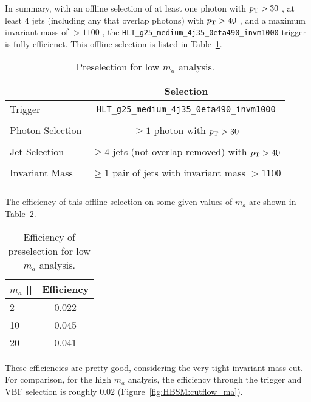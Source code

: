 In summary, with an offline selection of at least one photon with $p_{\text{T}}{}>30$ \GeV{}, at least 4 jets (including any that overlap photons) with $p_{\text{T}}{}>40$ \GeV{}, and a maximum invariant mass of $>1100$ \GeV{}, the \texttt{HLT\_g25\_medium\_4j35\_0eta490\_invm1000} trigger is fully efficienct.
This offline selection is listed in Table~\ref{tab:HBSM_app:new_preselection}.
\begin{table}[htbp]
  \begin{center}
  \caption{Preselection for low $m_a$ analysis.}
  \label{tab:HBSM_app:new_preselection}
    {\footnotesize
  \begin{tabular}{ l c }
    \toprule
    & Selection \\
    \midrule
    Trigger & \texttt{HLT\_g25\_medium\_4j35\_0eta490\_invm1000} \\
    \\
    Photon Selection  & $\geq1$ photon with $p_{\text{T}}{}>30$ \GeV{} \\
    \\ 
    Jet Selection  & $\geq4$ jets (not overlap-removed) with $p_{\text{T}}{}>40$ \GeV{} \\
    \\ 
    Invariant Mass  & $\geq1$ pair of jets with invariant mass $>1100$ \GeV{} \\
    \\ 
    \bottomrule
  \end{tabular}
    }
  \end{center}
\end{table}

The efficiency of this offline selection on some given values of $m_a$ are shown in Table~\ref{tab:HBSM_app:new_preselection_eff}.
\begin{table}[htbp]
  \begin{center}
  \caption{Efficiency of preselection for low $m_a$ analysis.}
  \label{tab:HBSM_app:new_preselection_eff}
    {\footnotesize
  \begin{tabular}{ l c }
    \toprule
    $m_a$ [\GeV{}] & Efficiency \\
    \midrule
    2 & 0.022 \\
    10 & 0.045 \\
    20 & 0.041 \\
    \bottomrule
  \end{tabular}
    }
  \end{center}
\end{table}
These efficiencies are pretty good, considering the very tight invariant mass cut.
For comparison, for the high $m_a$ analysis, the efficiency through the trigger and VBF selection is roughly $0.02$ (Figure~\ref{fig:HBSM:cutflow_ma}).
